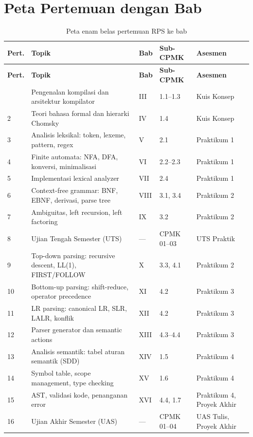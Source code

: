 \section*{Peta Pertemuan dengan Bab}

{\small
\begin{longtable}{@{}p{0.9cm}p{5.8cm}p{1.6cm}p{2.6cm}p{2.7cm}@{}}
\caption{Peta enam belas pertemuan RPS ke bab}
\label{tab:peta-pertemuan}\\
\toprule
\textbf{Pert.} & \textbf{Topik} & \textbf{Bab} & \textbf{Sub-CPMK} &
\textbf{Asesmen} \\
\midrule
\endfirsthead
\toprule
\textbf{Pert.} & \textbf{Topik} & \textbf{Bab} & \textbf{Sub-CPMK} &
\textbf{Asesmen} \\
\midrule
\endhead
\bottomrule
\endfoot
1 & Pengenalan kompilasi dan arsitektur kompilator & III & 1.1--1.3 &
Kuis Konsep \\
2 & Teori bahasa formal dan hierarki Chomsky & IV & 1.4 &
Kuis Konsep \\
3 & Analisis leksikal: token, lexeme, pattern, regex & V & 2.1 &
Praktikum 1 \\
4 & Finite automata: NFA, DFA, konversi, minimalisasi & VI & 2.2--2.3 &
Praktikum 1 \\
5 & Implementasi lexical analyzer & VII & 2.4 & Praktikum 1 \\
6 & Context-free grammar: BNF, EBNF, derivasi, parse tree & VIII &
3.1, 3.4 & Praktikum 2 \\
7 & Ambiguitas, left recursion, left factoring & IX & 3.2 &
Praktikum 2 \\
8 & Ujian Tengah Semester (UTS) & --- & CPMK 01--03 & UTS Praktik \\
9 & Top-down parsing: recursive descent, LL(1), FIRST/FOLLOW & X &
3.3, 4.1 & Praktikum 2 \\
10 & Bottom-up parsing: shift-reduce, operator precedence & XI & 4.2 &
Praktikum 3 \\
11 & LR parsing: canonical LR, SLR, LALR, konflik & XII & 4.2 &
Praktikum 3 \\
12 & Parser generator dan semantic actions & XIII & 4.3--4.4 &
Praktikum 3 \\
13 & Analisis semantik: tabel aturan semantik (SDD) & XIV & 1.5 &
Praktikum 4 \\
14 & Symbol table, scope management, type checking & XV & 1.6 &
Praktikum 4 \\
15 & AST, validasi kode, penanganan error & XVI & 4.4, 1.7 &
Praktikum 4, Proyek Akhir \\
16 & Ujian Akhir Semester (UAS) & --- & CPMK 01--04 &
UAS Tulis, Proyek Akhir \\
\end{longtable}
}

